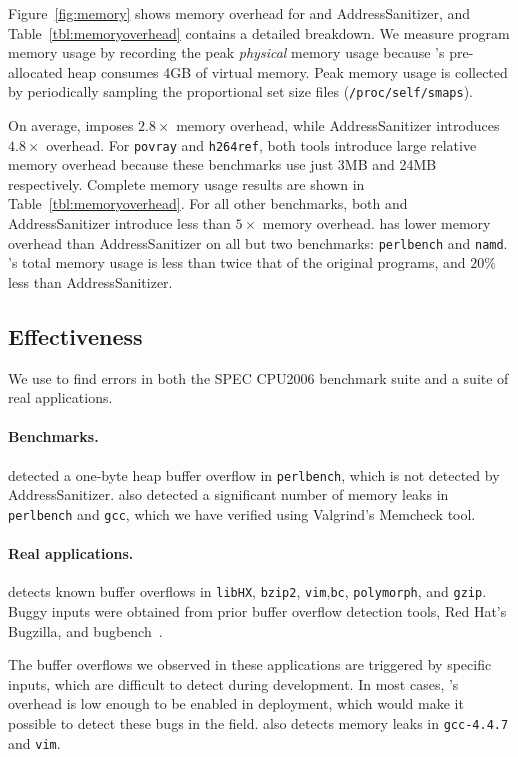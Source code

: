 Figure~\ref{fig:memory} shows memory overhead for \doubletake{} and AddressSanitizer, and Table~\ref{tbl:memoryoverhead} contains a detailed breakdown. We measure program memory usage by recording the peak \emph{physical} memory usage because \doubletake{}'s pre-allocated heap consumes 4GB of virtual memory. Peak memory usage is collected by periodically sampling the proportional set size files (\texttt{/proc/self/smaps}).

On average, \doubletake{} imposes $2.8\times$ memory overhead, while AddressSanitizer introduces $4.8\times$ overhead. For \texttt{povray} and \texttt{h264ref}, both tools introduce large relative memory overhead because these benchmarks use just 3MB and 24MB respectively. Complete memory usage results are shown in Table~\ref{tbl:memoryoverhead}. For all other benchmarks, both \doubletake{} and AddressSanitizer introduce less than $5\times$ memory overhead. \doubletake{} has lower memory overhead than AddressSanitizer on all but two benchmarks: \texttt{perlbench} and \texttt{namd}. \doubletake{}'s total memory usage is less than twice that of the original programs, and $20\%$ less than AddressSanitizer. 




\subsection{Effectiveness}
\label{sec:effect}

We use \doubletake{} to find errors in both the SPEC CPU2006 benchmark suite and a suite of real applications.

\paragraph{Benchmarks.}
\doubletake{} detected a one-byte heap buffer overflow in \texttt{perlbench}, which is not detected by AddressSanitizer. \doubletake{} also detected a significant number of memory leaks in \texttt{perlbench} and \texttt{gcc}, which we have verified using Valgrind's Memcheck tool.

\paragraph{Real applications.}
\doubletake{} detects known buffer overflows in \texttt{libHX}, \texttt{bzip2}, \texttt{vim},\texttt{bc}, \texttt{polymorph}, and \texttt{gzip}. Buggy inputs were obtained from prior buffer overflow detection tools, Red Hat's Bugzilla, and bugbench~\cite{vimoverflow, bzip2overflow,bugbench,overflow:Cruiser}.

The buffer overflows we observed in these applications are triggered by specific inputs, which are difficult to detect during development. In most cases, \doubletake{}'s overhead is low enough to be enabled in deployment, which would make it possible to detect these bugs in the field.  \doubletake{} also detects memory leaks in \texttt{gcc-4.4.7} and \texttt{vim}.
